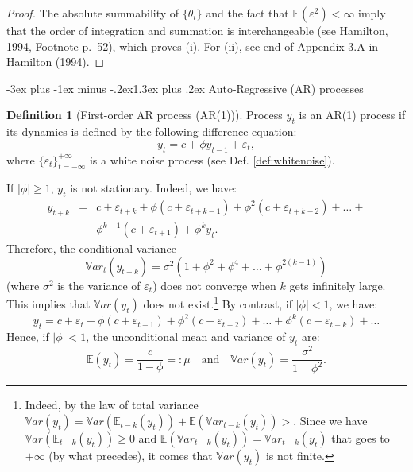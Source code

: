 \documentclass[
  11pt,
]{book}
\makeatletter
\renewcommand\section{\@startsection{section}{1}{\z@}
  {-3ex plus -1ex minus -.2ex}{1.3ex plus .2ex}
  {\normalfont\Large\bfseries\color{TextbookInk}}}
\theoremstyle{definition}
\newtheorem{definition}{Definition}[chapter]
\theoremstyle{definition}
\theoremstyle{definition}
\theoremstyle{definition}
\theoremstyle{remark}
\makeatother
\begin{document}
\begin{proof}
The absolute summability of \(\{\theta_{i}\}\) and the fact that \(\mathbb{E}(\varepsilon^2)<\infty\) imply that the order of integration and summation is interchangeable (see Hamilton, 1994, Footnote p.~52), which proves (i). For (ii), see end of Appendix 3.A in Hamilton (1994).
\end{proof}

\section{Auto-Regressive (AR) processes}\label{ARsection}

\begin{definition}[First-order AR process (AR(1))]
\protect\hypertarget{def:AR1}{}\label{def:AR1}Process \(y_t\) is an AR(1) process if its dynamics is defined by the following difference equation:
\[
y_t = c + \phi y_{t-1} + \varepsilon_t,
\]
where \(\{\varepsilon_t\}_{t = -\infty}^{+\infty}\) is a white noise process (see Def. \ref{def:whitenoise}).
\end{definition}

If \(|\phi|\ge1\), \(y_t\) is not stationary. Indeed, we have:
\begin{eqnarray*}
y_{t+k} &=& c + \varepsilon_{t+k} + \phi  ( c + \varepsilon_{t+k-1})+ \phi^2  ( c + \varepsilon_{t+k-2})+ \dots + \\
&& \phi^{k-1}  ( c + \varepsilon_{t+1}) + \phi^k y_t.
\end{eqnarray*}
Therefore, the conditional variance
\[
\mathbb{V}ar_t(y_{t+k}) = \sigma^2(1 + \phi^2 + \phi^4 + \dots + \phi^{2(k-1)})
\]
(where \(\sigma^2\) is the variance of \(\varepsilon_t\)) does not converge when \(k\) gets infinitely large. This implies that \(\mathbb{V}ar(y_{t})\) does not exist.\footnote{Indeed, by the law of total variance \(\mathbb{V}ar(y_{t})=\mathbb{V}ar(\mathbb{E}_{t-k}(y_{t}))+\mathbb{E}(\mathbb{V}ar_{t-k}(y_{t}))>\). Since we have \(\mathbb{V}ar(\mathbb{E}_{t-k}(y_{t})) \ge 0\) and \(\mathbb{E}(\mathbb{V}ar_{t-k}(y_{t}))=\mathbb{V}ar_{t-k}(y_{t})\) that goes to \(+\infty\) (by what precedes), it comes that \(\mathbb{V}ar(y_{t})\) is not finite.} By contrast, if \(|\phi| < 1\), we have:
\[
y_t = c + \varepsilon_t + \phi  ( c + \varepsilon_{t-1})+ \phi^2  ( c + \varepsilon_{t-2})+ \dots + \phi^k  ( c + \varepsilon_{t-k}) + \dots
\]
Hence, if \(|\phi| < 1\), the unconditional mean and variance of \(y_t\) are:
\[
\mathbb{E}(y_t) = \frac{c}{1-\phi} =: \mu \quad \mbox{and} \quad \mathbb{V}ar(y_t) = \frac{\sigma^2}{1-\phi^2}.
\]
\end{document}
